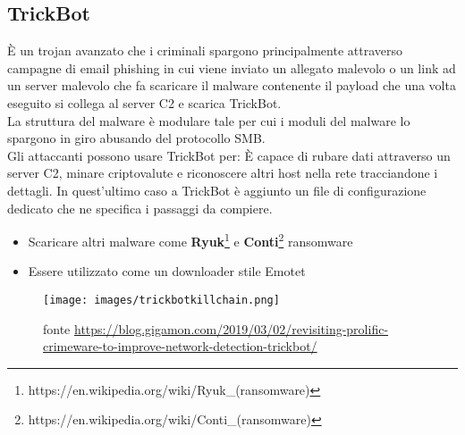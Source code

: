 \subsection{TrickBot}
\label{subsec:trickbot}
È un trojan avanzato che i criminali spargono principalmente attraverso campagne di email phishing in cui viene inviato un allegato malevolo o un link ad un server malevolo che fa scaricare il malware contenente il payload che una volta eseguito si collega al server \acrshort{C2} e scarica TrickBot.\\
La struttura del malware è modulare tale per cui i moduli del malware lo spargono in giro abusando del protocollo \acrfull{SMB}.\\
Gli attaccanti possono usare TrickBot per:
È capace di rubare dati attraverso un server \acrshort{C2}, minare criptovalute e riconoscere altri host nella rete tracciandone i dettagli.
In quest'ultimo caso a TrickBot è aggiunto un file di configurazione dedicato che ne specifica i passaggi da compiere.
\begin{itemize}[noitemsep]
    \item Scaricare altri malware come \textbf{Ryuk}\footnote{https://en.wikipedia.org/wiki/Ryuk\_(ransomware)} e \textbf{Conti}\footnote{https://en.wikipedia.org/wiki/Conti\_(ransomware)} ransomware
    \item Essere utilizzato come un downloader stile Emotet
\end{itemize}
\begin{figure}[!htp]
    \centering
    \texttt{[image: images/trickbotkillchain.png]}
    \caption{fonte \url{https://blog.gigamon.com/2019/03/02/revisiting-prolific-crimeware-to-improve-network-detection-trickbot/}}
    \label{fig:trickbotkillchain}
\end{figure}